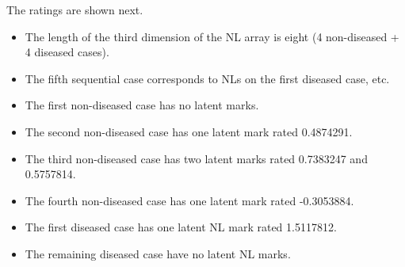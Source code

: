 \documentclass[
]{book}
\newenvironment{Shaded}{\begin{snugshade}}{\end{snugshade}}
\newcommand{\CommentTok}[1]{\textcolor[rgb]{0.56,0.35,0.01}{\textit{#1}}}
\newcommand{\DecValTok}[1]{\textcolor[rgb]{0.00,0.00,0.81}{#1}}
\newcommand{\FunctionTok}[1]{\textcolor[rgb]{0.00,0.00,0.00}{#1}}
\newcommand{\NormalTok}[1]{#1}
\newcommand{\OtherTok}[1]{\textcolor[rgb]{0.56,0.35,0.01}{#1}}
\newcommand{\SpecialCharTok}[1]{\textcolor[rgb]{0.00,0.00,0.00}{#1}}
\newcommand{\StringTok}[1]{\textcolor[rgb]{0.31,0.60,0.02}{#1}}
\providecommand{\tightlist}{%
  \setlength{\itemsep}{0pt}\setlength{\parskip}{0pt}}
\begin{document}
The ratings are shown next.

\begin{Shaded}
\end{Shaded}

\begin{itemize}
\tightlist
\item
  The length of the third dimension of the NL array is eight (4 non-diseased + 4 diseased cases).
\item
  The fifth sequential case corresponds to NLs on the first diseased case, etc.
\item
  The first non-diseased case has no latent marks.
\item
  The second non-diseased case has one latent mark rated 0.4874291.
\item
  The third non-diseased case has two latent marks rated 0.7383247 and 0.5757814.
\item
  The fourth non-diseased case has one latent mark rated -0.3053884.
\item
  The first diseased case has one latent NL mark rated 1.5117812.
\item
  The remaining diseased case have no latent NL marks.
\end{itemize}
\end{document}
